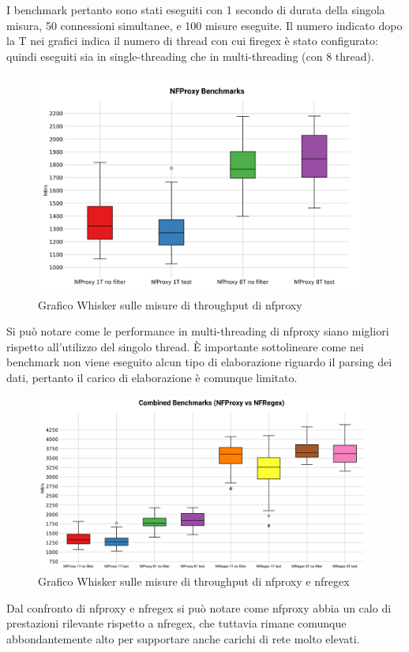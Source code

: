 I benchmark pertanto sono stati eseguiti con 1 secondo di durata della singola misura, 50 connessioni simultanee, e 100 misure eseguite. Il numero indicato dopo la T nei grafici indica il numero di thread con cui firegex è stato configurato: quindi eseguiti sia in single-threading che in multi-threading (con 8 thread).

\begin{figure}[H]
    \centering
    \includegraphics[width=0.98\textwidth]{images/chapter4/whisker_nfproxy.png}
    \caption{Grafico Whisker sulle misure di throughput di \gls{nfproxy}}\label{fig:wisker_nfproxy}
\end{figure}

Si può notare come le performance in multi-threading di \gls{nfproxy} siano migliori rispetto all'utilizzo del singolo thread. È importante sottolineare come nei benchmark non viene eseguito alcun tipo di elaborazione riguardo il parsing dei dati, pertanto il carico di elaborazione è comunque limitato.

\begin{figure}[H]
    \centering
    \includegraphics[width=0.98\textwidth]{images/chapter4/whisker_compare.png}
    \caption{Grafico Whisker sulle misure di throughput di \gls{nfproxy} e \gls{nfregex}}\label{fig:wisker_nfproxy_nfregex}
\end{figure}

Dal confronto di \gls{nfproxy} e \gls{nfregex} si può notare come \gls{nfproxy} abbia un calo di prestazioni rilevante rispetto a \gls{nfregex}, che tuttavia rimane comunque abbondantemente alto per supportare anche carichi di rete molto elevati.
